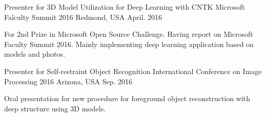 


\begin{cventries}


\cventry
{Presenter for 3D Model Utilization for Deep Learning with CNTK} %
{Microsoft Falculty Summit 2016} %
{Redmond, USA} %
{April. 2016} %
{ %
\begin{cvitems}
\item {For 2nd Prize in Microsoft Open Source Challenge. Having report on Microsoft Faculty Summit 2016. Mainly implementing deep learning application based on models and photos.}
\end{cvitems}
}


\cventry
{Presenter for Self-restraint Object Recognition} %
{International Conference on Image Processing 2016} %
{Arizona, USA} %
{Sep. 2016} %
{ %
\begin{cvitems}
\item {Oral presentation for new procedure for foreground object reconstruction with deep structure using 3D models.}
\end{cvitems}
}


\end{cventries}
